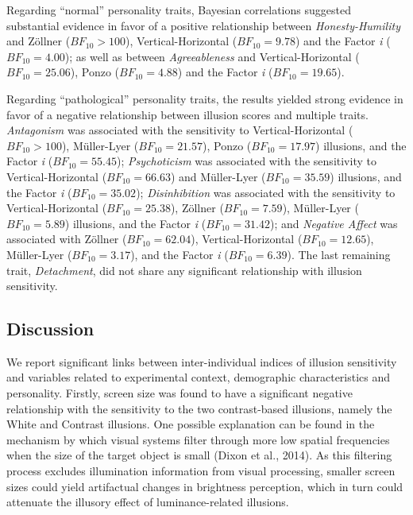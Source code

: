 \documentclass[
  man,floatsintext]{apa6}
\begin{document}
Regarding ``normal'' personality traits, Bayesian correlations suggested substantial evidence in favor of a positive relationship between \emph{Honesty-Humility} and Zöllner (\(BF_{10} > 100\)), Vertical-Horizontal (\(BF_{10} = 9.78\)) and the Factor \emph{i} (\(BF_{10} = 4.00\)); as well as between \emph{Agreeableness} and Vertical-Horizontal (\(BF_{10} = 25.06\)), Ponzo (\(BF_{10} = 4.88\)) and the Factor \emph{i} (\(BF_{10} = 19.65\)).

Regarding ``pathological'' personality traits, the results yielded strong evidence in favor of a negative relationship between illusion scores and multiple traits. \emph{Antagonism} was associated with the sensitivity to Vertical-Horizontal (\(BF_{10} > 100\)), Müller-Lyer (\(BF_{10} = 21.57\)), Ponzo (\(BF_{10} = 17.97\)) illusions, and the Factor \emph{i} (\(BF_{10} = 55.45\)); \emph{Psychoticism} was associated with the sensitivity to Vertical-Horizontal (\(BF_{10} = 66.63\)) and Müller-Lyer (\(BF_{10} = 35.59\)) illusions, and the Factor \emph{i} (\(BF_{10} = 35.02\)); \emph{Disinhibition} was associated with the sensitivity to Vertical-Horizontal (\(BF_{10} = 25.38\)), Zöllner (\(BF_{10} = 7.59\)), Müller-Lyer (\(BF_{10} = 5.89\)) illusions, and the Factor \emph{i} (\(BF_{10} = 31.42\)); and \emph{Negative Affect} was associated with Zöllner (\(BF_{10} = 62.04\)), Vertical-Horizontal (\(BF_{10} = 12.65\)), Müller-Lyer (\(BF_{10} = 3.17\)), and the Factor \emph{i} (\(BF_{10} = 6.39\)). The last remaining trait, \emph{Detachment}, did not share any significant relationship with illusion sensitivity.

\hypertarget{discussion-2}{%
\subsection{Discussion}\label{discussion-2}}

We report significant links between inter-individual indices of illusion sensitivity and variables related to experimental context, demographic characteristics and personality. Firstly, screen size was found to have a significant negative relationship with the sensitivity to the two contrast-based illusions, namely the White and Contrast illusions. One possible explanation can be found in the mechanism by which visual systems filter through more low spatial frequencies when the size of the target object is small (Dixon et al., 2014). As this filtering process excludes illumination information from visual processing, smaller screen sizes could yield artifactual changes in brightness perception, which in turn could attenuate the illusory effect of luminance-related illusions.
\end{document}
